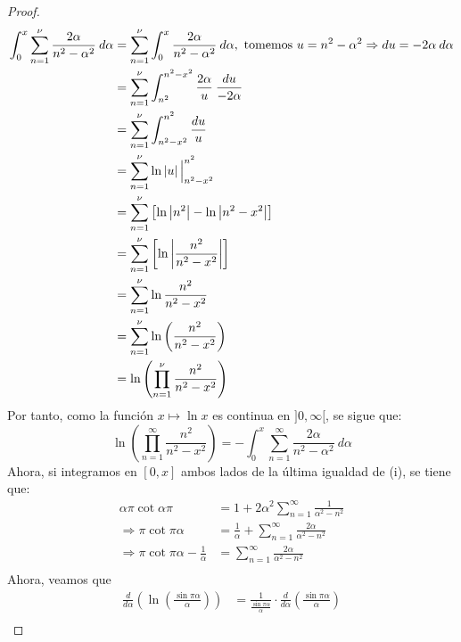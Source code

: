 \documentclass[12pt]{report}
\newcounter{it}
\theoremstyle{largebreak}
\newcommand\abs[1]{\ensuremath{\left|#1\right|}}
\begin{document}
\begin{proof}
\begin{equation*}
\begin{split}
                \int_{0}^x \sum_{n=1}^\nu\frac{2\alpha}{n^2-\alpha^2}\:d\alpha&=\sum_{n=1}^\nu\int_{0}^x\frac{2\alpha}{n^2-\alpha^2}\:d\alpha,\textup{ tomemos }u=n^2-\alpha^2\Rightarrow du=-2\alpha\:d\alpha \\
                &=\sum_{n=1}^\nu\int_{n^2}^{n^2-x^2}\frac{2\alpha}{u}\: \frac{du}{-2\alpha}\\
                &=\sum_{n=1}^\nu\int_{n^2-x^2}^{n^2}\frac{du}{u}\\
                &=\sum_{n=1}^\nu\ln\abs{u}\Big|_{n^2-x^2}^{n^2}\\
                &=\sum_{n=1}^\nu\left[\ln\abs{n^2}-\ln\abs{n^2-x^2}\right]\\
                &=\sum_{n=1}^\nu\left[\ln\abs{\frac{n^2}{n^2-x^2}}\right]\\
                &=\sum_{n=1}^\nu\ln\frac{n^2}{n^2-x^2}\\
                &=\sum_{n=1}^\nu\ln\left(\frac{n^2}{n^2-x^2}\right)\\
                &=\ln\left(\prod_{ n=1}^\nu\frac{n^2}{n^2-x^2}\right)\\
            \end{split}
        \end{equation*}
        Por tanto, como la función $x\mapsto\ln x$ es continua en $]0,\infty[$, se sigue que:
        \begin{equation*}
            \ln\left(\prod_{ n=1}^\infty\frac{n^2}{n^2-x^2}\right)=-\int_0^x\sum_{ n=1}^\infty\frac{2\alpha}{n^2-\alpha^2}\:d\alpha
        \end{equation*}
        Ahora, si integramos en $[0,x]$ ambos lados de la última igualdad de (i), se tiene que:
        \begin{equation*}
            \begin{split}
                \alpha\pi\cot\alpha\pi&=1+2\alpha^2\sum_{n=1}^{\infty}\frac{1}{\alpha^2-n^2}\\
                \Rightarrow \pi\cot\pi\alpha&=\frac{1}{\alpha}+\sum_{n=1}^{\infty}\frac{2\alpha}{\alpha^2-n^2}\\
                \Rightarrow \pi\cot\pi\alpha-\frac{1}{\alpha}&=\sum_{n=1}^{\infty}\frac{2\alpha}{\alpha^2-n^2}\\
            \end{split}
        \end{equation*}
        Ahora, veamos que
        \begin{equation*}
            \begin{split}
                \frac{d}{d\alpha}\left(\ln\left(\frac{\sin \pi\alpha}{\alpha}\right)\right)&=\frac{1}{\frac{\sin \pi\alpha}{\alpha}}\cdot\frac{d}{d\alpha}\left(\frac{\sin \pi\alpha}{\alpha}\right)\\

\end{split}
\end{equation*}
\end{proof}
\end{document}
